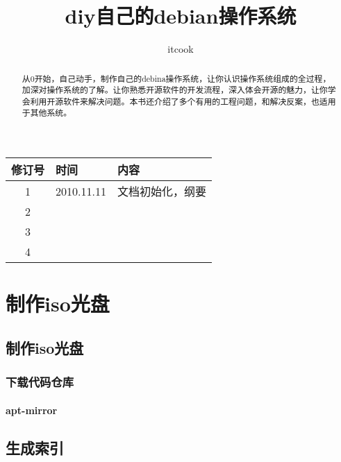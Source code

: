 \documentclass[a4paper,10pt]{article}
\title{diy自己的debian操作系统}
\author{itcook}
\begin{document}
\begin{CJK}{UTF8}{gbsn}

\maketitle

\begin{abstract}
从0开始，自己动手，制作自己的debina操作系统，让你认识操作系统组成的全过程，加深对操作系统的了解。让你熟悉开源软件的开发流程，深入体会开源的魅力，让你学会利用开源软件来解决问题。本书还介绍了多个有用的工程问题，和解决反案，也适用于其他系统。
\end{abstract}

\CJKindent
\newpage
\tableofcontents
\setcounter{tocdepth}{3}



\newpage
\begin{center}
\begin{tabular}{|c|l|l|}
    \hline
    修订号 & 时间 & 内容 \\
    \hline
    1 & 2010.11.11 & 文档初始化，纲要 \\
    \hline
    2 &  &  \\
    \hline
    3 &  &  \\
    \hline
    4 &  &  \\
    \hline
\end{tabular}
\end{center}
\newpage

\part{制作iso光盘}
\chapter{制作iso光盘}
\section{下载代码仓库}
\subsection{apt-mirror}
\subsubsection{}
\chapter{生成索引}

\end{CJK}
\end{document}

